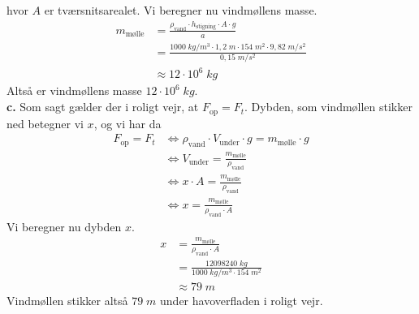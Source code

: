 \documentclass{report}
\begin{document}
hvor $A$ er tværsnitsarealet. 
Vi beregner nu vindmøllens masse.
\begin{equation*}
\begin{split}
  m_{\text{mølle} }&=\frac{\rho _{\text{vand} }\cdot h _{\text{stigning} } \cdot A \cdot g}{a}\\
  &=\frac{1000 \;\unit{kg/m^3} \cdot 1,2 \;\unit{m} \cdot 154 \;\unit{m^2} \cdot 9,82 \;\unit{m/s^2} }{0,15 \;\unit{m/s^2} }\\
  &\approx 12 \cdot 10 ^{6} \;\unit{kg} 
\end{split}
\end{equation*}
Altså er vindmøllens masse $12 \cdot 10^6 \;\unit{kg} $.\\[1ex]
\textbf{c.}
Som sagt gælder der i roligt vejr, at $F _{\text{op} }=F_t$.
Dybden, som vindmøllen stikker ned betegner vi $x$, og vi har da 
\begin{equation*}
\begin{split}
  F _{\text{op} }=F_t &\iff \rho _{\text{vand} } \cdot V _{\text{under} } \cdot g = m_{\text{mølle} } \cdot g\\
  &\iff V _{\text{under} }=\frac{m _{\text{mølle} }}{\rho _{\text{vand} }}\\
  &\iff x \cdot A = \frac{m _{\text{mølle} }}{\rho _{\text{vand} }}\\
  &\iff x=\frac{m _{\text{mølle} }}{\rho _{\text{vand} } \cdot A}
\end{split}
\end{equation*}
Vi beregner nu dybden $x$.
\begin{equation*}
\begin{split}
  x&=\frac{m _{\text{mølle} }}{\rho _{\text{vand} } \cdot A}\\
  &=\frac{12098240 \;\unit{kg} }{1000 \;\unit{kg/m^3} \cdot 154 \;\unit{m^2} }\\
  &\approx 79 \;\unit{m} 
\end{split}
\end{equation*}
Vindmøllen stikker altså $79 \;\unit{m} $ under havoverfladen i roligt vejr. 
\end{document}
